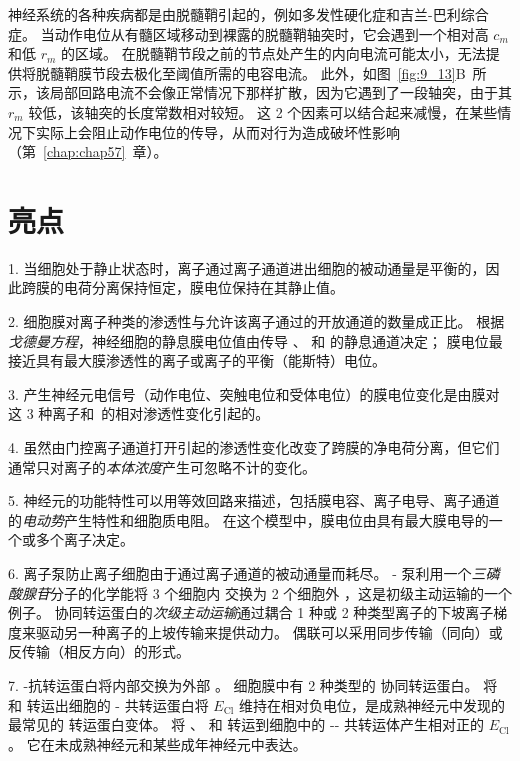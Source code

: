 神经系统的各种疾病都是由脱髓鞘引起的，例如多发性硬化症和吉兰-巴利综合症。
当动作电位从有髓区域移动到裸露的脱髓鞘轴突时，它会遇到一个相对高 $c_m$ 和低 $r_m$ 的区域。
在脱髓鞘节段之前的节点处产生的内向电流可能太小，无法提供将脱髓鞘膜节段去极化至阈值所需的电容电流。
此外，如图~\ref{fig:9_13}B~所示，该局部回路电流不会像正常情况下那样扩散，因为它遇到了一段轴突，由于其 $r_m$ 较低，该轴突的长度常数相对较短。
这 2 个因素可以结合起来减慢，在某些情况下实际上会阻止动作电位的传导，从而对行为造成破坏性影响（第~\ref{chap:chap57}~章）。



\section{亮点}

1. 当细胞处于静止状态时，离子通过离子通道进出细胞的被动通量是平衡的，因此跨膜的电荷分离保持恒定，膜电位保持在其静止值。


2. 细胞膜对离子种类的渗透性与允许该离子通过的开放通道的数量成正比。
根据\textit{戈德曼方程}，神经细胞的静息膜电位值由传导 、 和  的静息通道决定；
膜电位最接近具有最大膜渗透性的离子或离子的平衡（能斯特）电位。 


3. 产生神经元电信号（动作电位、突触电位和受体电位）的膜电位变化是由膜对这 3 种离子和~的相对渗透性变化引起的。


4. 虽然由门控离子通道打开引起的渗透性变化改变了跨膜的净电荷分离，但它们通常只对离子的\textit{本体浓度}产生可忽略不计的变化。


5. 神经元的功能特性可以用等效回路来描述，包括膜电容、离子电导、离子通道的\textit{电动势}产生特性和细胞质电阻。
在这个模型中，膜电位由具有最大膜电导的一个或多个离子决定。 


6. 离子泵防止离子细胞由于通过离子通道的被动通量而耗尽。
- 泵利用一个\textit{三磷酸腺苷}分子的化学能将 3 个细胞内  交换为 2 个细胞外 ，这是初级主动运输的一个例子。
协同转运蛋白的\textit{次级主动运输}通过耦合 1 种或 2 种类型离子的下坡离子梯度来驱动另一种离子的上坡传输来提供动力。
偶联可以采用同步传输（同向）或反传输（相反方向）的形式。 


7. -抗转运蛋白将内部交换为外部 。
细胞膜中有 2 种类型的  协同转运蛋白。
将  和  转运出细胞的 - 共转运蛋白将 $E_\text{Cl}$ 维持在相对负电位，是成熟神经元中发现的最常见的  转运蛋白变体。
将 、 和  转运到细胞中的 -- 共转运体产生相对正的 $E_\text{Cl}$。
它在未成熟神经元和某些成年神经元中表达。 


